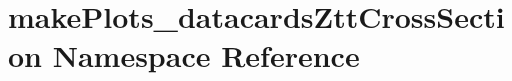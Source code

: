 \hypertarget{namespacemakePlots__datacardsZttCrossSection}{
\section{makePlots\_\-datacardsZttCrossSection Namespace Reference}
\label{namespacemakePlots__datacardsZttCrossSection}
}
